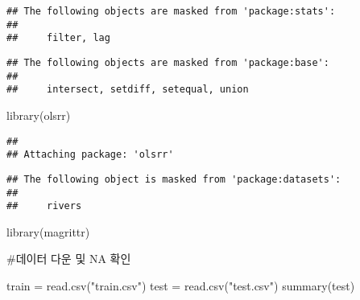 \documentclass[
]{article}
\newenvironment{Shaded}{\begin{snugshade}}{\end{snugshade}}
\newcommand{\FunctionTok}[1]{\textcolor[rgb]{0.00,0.00,0.00}{#1}}
\newcommand{\NormalTok}[1]{#1}
\newcommand{\OtherTok}[1]{\textcolor[rgb]{0.56,0.35,0.01}{#1}}
\newcommand{\StringTok}[1]{\textcolor[rgb]{0.31,0.60,0.02}{#1}}
\begin{document}
\begin{verbatim}
## The following objects are masked from 'package:stats':
## 
##     filter, lag
\end{verbatim}

\begin{verbatim}
## The following objects are masked from 'package:base':
## 
##     intersect, setdiff, setequal, union
\end{verbatim}

\begin{Shaded}
\begin{Highlighting}[]
\FunctionTok{library}\NormalTok{(olsrr)}
\end{Highlighting}
\end{Shaded}

\begin{verbatim}
## 
## Attaching package: 'olsrr'
\end{verbatim}

\begin{verbatim}
## The following object is masked from 'package:datasets':
## 
##     rivers
\end{verbatim}

\begin{Shaded}
\begin{Highlighting}[]
\FunctionTok{library}\NormalTok{(magrittr)}
\end{Highlighting}
\end{Shaded}

\#데이터 다운 및 NA 확인

\begin{Shaded}
\begin{Highlighting}[]
\NormalTok{train }\OtherTok{=} \FunctionTok{read.csv}\NormalTok{(}\StringTok{"train.csv"}\NormalTok{)}
\NormalTok{test }\OtherTok{=} \FunctionTok{read.csv}\NormalTok{(}\StringTok{"test.csv"}\NormalTok{)}
\FunctionTok{summary}\NormalTok{(test)}
\end{Highlighting}
\end{Shaded}
\end{document}

